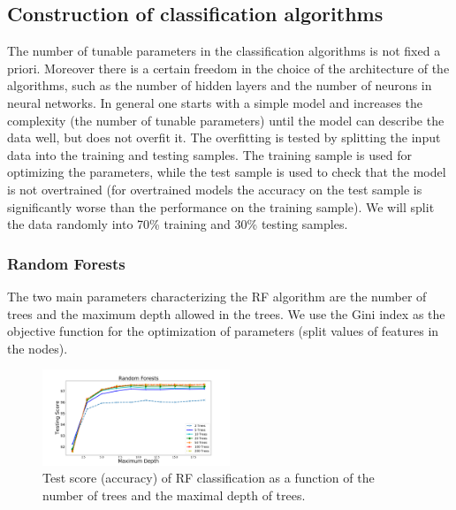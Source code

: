\subsection{Construction of classification algorithms}

The number of tunable parameters in the classification algorithms is not fixed a priori. 
Moreover there is a certain freedom in the choice of the architecture of the algorithms, such as
the number of hidden layers and the number of neurons in neural networks.
In general one starts with a simple model and increases the complexity (the number of tunable parameters)
until the model can describe the data well, but does not overfit it.
The overfitting is tested by splitting the input data into the training and testing samples.
The training sample is used for optimizing the parameters,
while the test sample is used to check that the model is not overtrained (for overtrained models the accuracy on the test
sample is significantly worse than the performance on the training sample).
We will split the data randomly into 70\% training and 30\% testing samples.



\subsubsection{Random Forests}

The two main parameters characterizing the RF algorithm are the number of trees and the maximum depth allowed in the trees. 
We use the Gini index as the objective function for the optimization of parameters (split values of features in the nodes).

\begin{figure}[h]

\hspace*{-0.5cm}
\includegraphics[width=0.5\textwidth]{plots/rf_train_assocnewfeats}
\caption{
Test score (accuracy) of RF classification as a function of the number of trees and 
the maximal depth of trees.
}
\label{fig:RF_complexity}
\end{figure}

